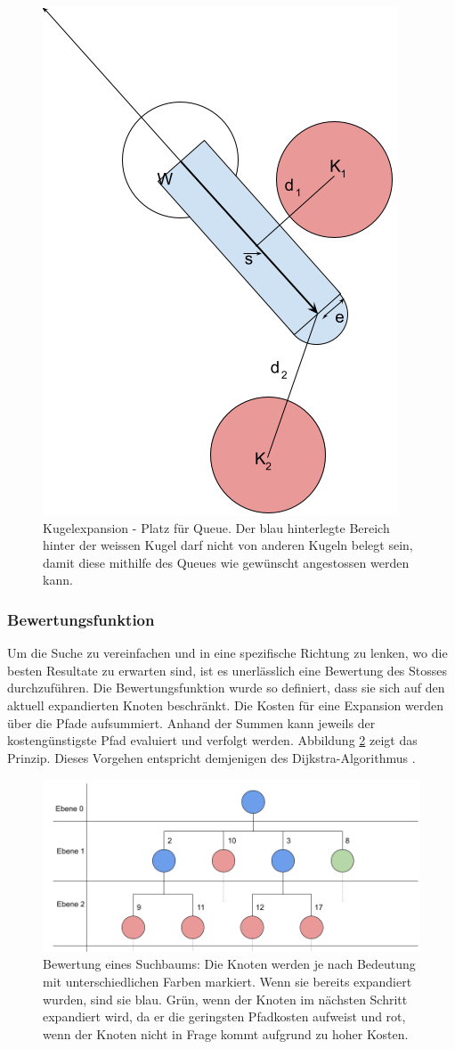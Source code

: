 \begin{figure}[h!]
    \begin{center}
        \includegraphics[width=0.3\linewidth]{../common/03_billiard_ai/resources/37_platz_fuer_queue.png}
    \end{center}
    \caption{Kugelexpansion - Platz für Queue. Der blau hinterlegte Bereich hinter der weissen Kugel darf nicht von anderen Kugeln belegt sein,
        damit diese mithilfe des Queues wie gewünscht angestossen werden kann.}
    \label{fig:kugelexpansion_platz_fuer_queue}
\end{figure}

\newpage
\subsubsection{Bewertungsfunktion}
Um die Suche zu vereinfachen und in eine spezifische Richtung zu lenken, wo die besten Resultate zu erwarten sind, ist
es unerlässlich eine Bewertung des Stosses durchzuführen.
Die Bewertungsfunktion wurde so definiert, dass sie sich auf den aktuell expandierten Knoten beschränkt.
Die Kosten für eine Expansion werden über die Pfade aufsummiert.
Anhand der Summen kann jeweils der kostengünstigste Pfad evaluiert und verfolgt werden.
Abbildung \ref{fig:suchbaum_bewertung} zeigt das Prinzip.
Dieses Vorgehen entspricht demjenigen des Dijkstra-Algorithmus \cite{wiki.dijkstra:1}.
\begin{figure}[h!]
    \begin{center}
        \includegraphics[width=0.8\linewidth]{../common/03_billiard_ai/resources/28_suchbaum_bewertung.png}
    \end{center}
    \caption{Bewertung eines Suchbaums: Die Knoten werden je nach Bedeutung mit unterschiedlichen Farben markiert.
    Wenn sie bereits expandiert wurden, sind sie blau. Grün, wenn der Knoten im nächsten Schritt expandiert wird,
    da er die geringsten Pfadkosten aufweist und rot, wenn der Knoten nicht in Frage kommt aufgrund zu hoher Kosten.}
    \label{fig:suchbaum_bewertung}
\end{figure}

